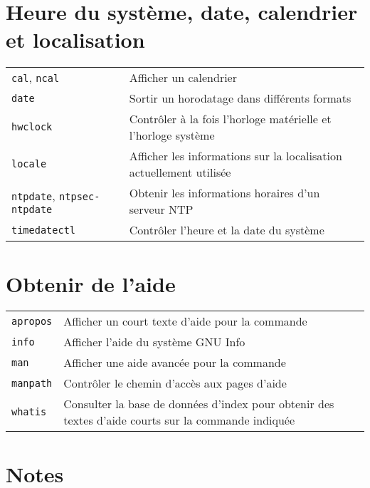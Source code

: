 \documentclass[10pt,a4paper]{article}
\begin{document}
\begin{multicols}{2}
\section{Heure du système, date, calendrier et localisation}
\begin{tabular}{ p{2.75cm} p{8.25cm} }
  \hline
  \texttt{cal}, \texttt{ncal} & Afficher un calendrier\\
  \rowcolor{Gray}
  \texttt{date} & Sortir un horodatage dans différents formats \\
  \texttt{hwclock} & Contrôler à la fois l'horloge matérielle et l'horloge système\\
  \rowcolor{Gray}
  \texttt{locale} & Afficher les informations sur la localisation actuellement utilisée \\
  \texttt{ntpdate}, \texttt{ntpsec-ntpdate} & Obtenir les informations horaires d'un serveur NTP \\
  \rowcolor{Gray}
  \texttt{timedatectl} & Contrôler l'heure et la date du système \\
  \hline
\end{tabular}

\columnbreak

\section{Obtenir de l'aide}
\begin{tabular}{ p{2.5cm} p{8.5cm} }
  \hline
  \texttt{apropos} & Afficher un court texte d'aide pour la commande \\
  \rowcolor{Gray}
  \texttt{info} & Afficher l'aide du système GNU Info \\
  \texttt{man} & Afficher une aide avancée pour la commande \\
  \rowcolor{Gray}
  \texttt{manpath} & Contrôler le chemin d'accès aux pages d'aide \\
  \texttt{whatis} & Consulter la base de données d'index pour obtenir des textes d'aide courts sur la commande indiquée \\
  \hline
\end{tabular}
\section*{Notes}


\end{multicols}
\end{document}
